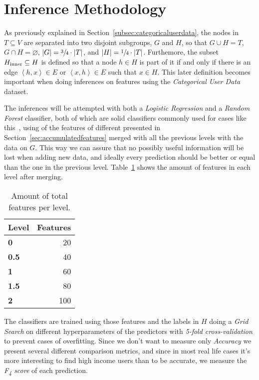 \section{Inference Methodology}

As previously explained in Section~\ref{subsec:categoricaluserdata}, the nodes in $T \subseteq V$ are separated into two disjoint subgroups, $G$ and $H$, so that $G \cup H = T$, $G \cap H = \varnothing$, $\left| G \right| = \sfrac{3}{4} \cdot \left| T \right|$, and $\left| H \right| = \sfrac{1}{4} \cdot \left| T \right|$. Furthemore, the subset $H_{\operatorname{inner}} \subseteq H$ is defined so that a node $h \in H$ is part of it if and only if there is an edge $\left< h, x \right> \in E$ or $\left< x, h \right> \in E$ such that $x \in H$\footnotemark{}. This later definition becomes important when doing inferences on features using the \emph{Categorical User Data} dataset.


The inferences will be attempted with both a \emph{Logistic Regression} and a \emph{Random Forest} classifier, both of which are solid classifiers commonly used for cases like this~\cite{binaryevaluation}, using of the features of different presented in Section~\ref{sec:accumulatedfeatures} merged with all the previous levels with the data on $G$. This way we can assure that no possibly useful information will be lost when adding new data, and ideally every prediction should be better or equal than the one in the previous level. Table~\ref{tab:features} shows the amount of features in each level after merging.

\begin{table}[t]
\centering
\begin{tabular}{>{\bfseries}l r}
\toprule
Level & Features \\
\midrule
0 & \num{20} \\
0.5 & \num{40} \\
1 & \num{60} \\
1.5 & \num{80} \\
2 & \num{100} \\
\bottomrule
\end{tabular}
\caption{Amount of total features per level. \\ }
\label{tab:features}
\end{table}

The classifiers are trained using those features and the labels in $H$ doing a \emph{Grid Search} on different hyperparameters of the predictors with \emph{5-fold cross-validation} to prevent cases of overfitting. Since we don't want to measure only \emph{Accuracy} we present several different comparison metrics, and since in most real life cases it's more interesting to find high income users than to be accurate\footnotemark{}, we measure the \emph{F\textsubscript{4} score} of each prediction.

